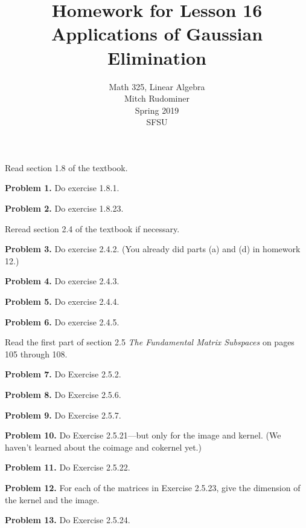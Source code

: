\documentclass[oneside,12pt]{amsart}
\begin{document}
\title{Homework for Lesson 16 \\ Applications of Gaussian Elimination}
\author{Math 325, Linear Algebra \\ Mitch Rudominer \\ Spring 2019 \\ SFSU }
\date{}

\maketitle

\bigskip

Read section 1.8 of the textbook.

\bigskip

\textbf{Problem 1.} Do exercise 1.8.1.

\bigskip
\bigskip
\bigskip


\textbf{Problem 2.} Do exercise 1.8.23.

\bigskip
\bigskip
\bigskip

Reread section 2.4 of the textbook if necessary.

\bigskip

\textbf{Problem 3.} Do exercise 2.4.2. (You already did parts (a) and (d) in homework 12.)

\bigskip
\bigskip
\bigskip

\textbf{Problem 4.} Do exercise 2.4.3.

\bigskip
\bigskip
\bigskip

\textbf{Problem 5.} Do exercise 2.4.4.

\bigskip
\bigskip
\bigskip

\textbf{Problem 6.} Do exercise 2.4.5.

\bigskip
\bigskip
\bigskip

Read the first part of section 2.5 \emph{The Fundamental Matrix Subspaces}
on pages 105 through 108.

\bigskip

\textbf{Problem 7.} Do Exercise 2.5.2.

\bigskip
\bigskip
\bigskip

\textbf{Problem 8.} Do Exercise 2.5.6.

\bigskip
\bigskip
\bigskip

\textbf{Problem 9.} Do Exercise 2.5.7.

\bigskip
\bigskip
\bigskip

\textbf{Problem 10.} Do  Exercise 2.5.21---but only for the image and kernel.
(We haven't learned about the coimage and cokernel yet.)

\bigskip
\bigskip
\bigskip

\textbf{Problem 11.} Do Exercise 2.5.22.

\bigskip
\bigskip
\bigskip

\textbf{Problem 12.} For each of the matrices in Exercise 2.5.23, give the
dimension of the kernel and the image.

\bigskip
\bigskip
\bigskip

\textbf{Problem 13.} Do  Exercise 2.5.24.
\end{document}

